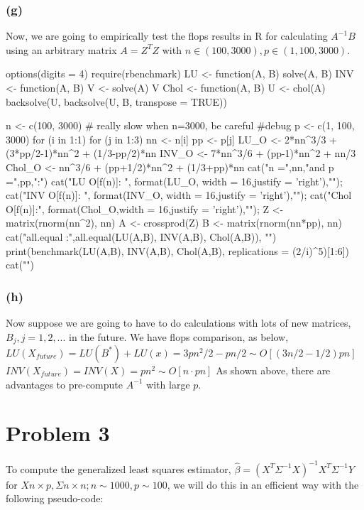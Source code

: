 \documentclass{article}
\begin{document}
\subsubsection*{(g)}
Now, we are going to empirically test the flops results in R for calculating $A^{-1}B$ using
an arbitrary matrix $A=Z^TZ$ with $n\in (100,3000), p\in (1,100,3000)$.

options(digits = 4)
require(rbenchmark)
LU <- function(A, B){ 
	solve(A, B)
}
INV <- function(A, B){ 
	V <- solve(A)
	V %
}
Chol <- function(A, B){ 
	U <- chol(A)
	backsolve(U, backsolve(U, B, transpose = TRUE))
}

n <- c(100, 3000) # really slow when n=3000, be careful  #debug
p <- c(1, 100, 3000)
for (i in 1:1){ 
	for (j in 1:3){
		nn <- n[i]
		pp <- p[j]
		LU_O   <- 2*nn^3/3 + (3*pp/2-1)*nn^2 + (1/3-pp/2)*nn
		INV_O  <- 7*nn^3/6 + (pp-1)*nn^2 + nn/3
		Chol_O <- nn^3/6 + (pp+1/2)*nn^2 + (1/3+pp)*nn
		cat("n =",nn,"and p =",pp,":\n")
		cat("LU O[f(n)]:  ", format(LU_O,  width = 16,justify = 'right'),"\n");
		cat("INV O[f(n)]: ", format(INV_O, width = 16,justify = 'right'),"\n");
		cat("Chol O[f(n)]:", format(Chol_O,width = 16,justify = 'right'),"\n"); 
		Z <- matrix(rnorm(nn^2), nn)
		A <- crossprod(Z) 
		B <- matrix(rnorm(nn*pp), nn) 
		cat("all.equal :",all.equal(LU(A,B), INV(A,B), Chol(A,B)), "\n")
		print(benchmark(LU(A,B), INV(A,B), Chol(A,B), replications = (2/i)^5)[1:6])
		cat("\n")
	}
}

\subsubsection*{(h)}
Now suppose we are going to have to do calculations with lots of new matrices, $B_j, j=1,2,...$
in the future. We have flops comparison, as below,
\newline
$LU(X_{future}) = LU(B^*) + LU(x) = 3pn^2/2 -pn/2 \sim O[(3n/2-1/2)pn]$
\newline
$INV(X_{future}) = INV(X) = pn^2 \sim O[n\cdot pn]$
\newline
As shown above, there are advantages to pre-compute $A^{-1}$ with large $p$.


\newpage
\section*{Problem 3}
To compute the generalized least squares estimator, 
$\hat\beta = (X^T\Sigma^{-1}X)^{-1}X^T\Sigma^{-1}Y$
for $X n\times p, \Sigma n\times n; n\sim 1000, p\sim 100$, we will
do this in an efficient way with the following pseudo-code:
\end{document}
